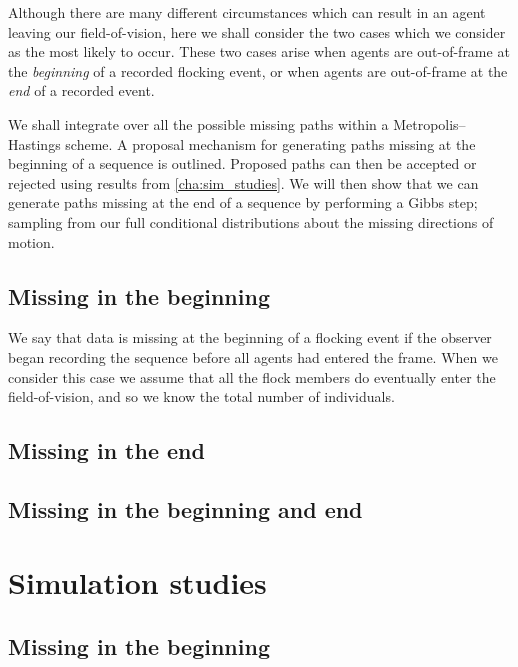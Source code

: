 Although there are many different circumstances which can result in an agent
leaving our field-of-vision, here we shall consider the two cases which we
consider as the most likely to occur. These two cases arise when agents are
out-of-frame at the \emph{beginning} of a recorded flocking event, or when
agents are out-of-frame at the \emph{end} of a recorded event.

We shall integrate over all the possible missing paths within a
Metropolis--Hastings scheme. A proposal mechanism for generating paths missing
at the beginning of a sequence is outlined. Proposed paths can then be accepted
or rejected using results from \cref{cha:sim_studies}. We will then show that
we can generate paths missing at the end of a sequence by performing a Gibbs
step; sampling from our full conditional distributions about the missing
directions of motion.

\subsection{Missing in the beginning}

We say that data is missing at the beginning of a flocking event if the
observer began recording the sequence before all agents had entered the frame.
When we consider this case we assume that all the flock members do eventually
enter the field-of-vision, and so we know the total number of individuals.

\subsection{Missing in the end}

\subsection{Missing in the beginning and end}

\section{Simulation studies}

\subsection{Missing in the beginning}

